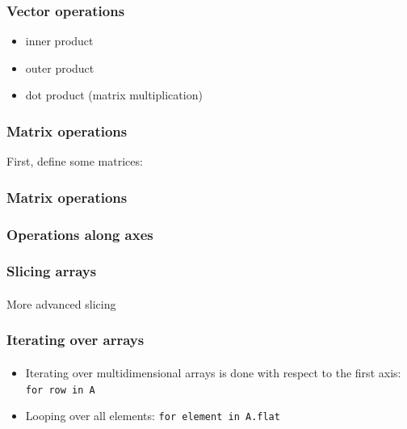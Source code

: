 \begin{frame}\frametitle{Vector operations}
    \begin{itemize}
        \item inner product
        \item outer product
        \item dot product (matrix multiplication)
    \end{itemize}


\end{frame}

\begin{frame}\frametitle{Matrix operations}

    First, define some matrices:


\end{frame}

\begin{frame}\frametitle{Matrix operations}


\end{frame}



\begin{frame}\frametitle{Operations along axes}
    \framesubtitle{}


\end{frame}

\begin{frame}\frametitle{Slicing arrays}
    \framesubtitle{}

    More advanced slicing


\end{frame}

\begin{frame}\frametitle{Iterating over arrays}
    \framesubtitle{}

    \begin{itemize}
        \item Iterating over multidimensional arrays is done with respect
        to the first axis: \texttt{for row in A}
        \item Looping over all elements:
        \texttt{for element in A.flat}
    \end{itemize}

\end{frame}

